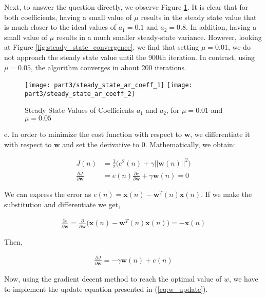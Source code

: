 \noindent{}Next, to answer the question directly, we observe Figure \ref{fig:steady_state_AR}. It is clear that for both coefficients, having a small value of $\mu$ results in the steady state value that is much closer to the ideal values of $a_1=0.1$ and $a_2=0.8$. In addition, having a small value of $\mu$ results in a much smaller steady-state variance. However, looking at Figure \ref{fig:steady_state_convergence}, we find that setting $\mu=0.01$, we do not approach the steady state value until the 900th iteration. In contrast, using $\mu=0.05$, the algorithm converges in about 200 iterations.

\begin{figure}[H]
\centering{}
\texttt{[image: part3/steady\_state\_ar\_coeff\_1]}
\texttt{[image: part3/steady\_state\_ar\_coeff\_2]}
\caption{Steady State Values of Coefficients $a_1$ and $a_2$, for $\mu=0.01$ and $\mu=0.05$}
\label{fig:steady_state_AR}
\end{figure}

\noindent{}e. In order to minimize the cost function with respect to $\textbf{w}$, we differentiate it with respect to $\textbf{w}$ and set the derivative to 0. Mathematically, we obtain:

\begin{align}
J(n) &= \frac{1}{2}\Bigg(e^2(n)+\gamma||\textbf{w}(n)||^2\Bigg) \label{eq:cost_func}\\ 
\frac{\partial J}{\partial \textbf{w}} &= e(n)\frac{\partial e}{\partial \textbf{w}} + \gamma \textbf{w}(n) = 0 \nonumber
\end{align}

\noindent{}We can express the error as $e(n)=\textbf{x}(n) - \textbf{w}^T(n)\textbf{x}(n)$. If we make the substitution and differentiate we get,

\begin{align*}
\frac{\partial e}{\partial \textbf{w}} = \frac{\partial}{\partial \textbf{w}}\Bigg(\textbf{x}(n) - \textbf{w}^T(n)\textbf{x}(n)\Bigg) = -\textbf{x}(n)
\end{align*}

\noindent{}Then,

\begin{align*}
\frac{\partial J}{\partial \textbf{w}} = -\gamma \textbf{w}(n) + e(n)
\end{align*}

\noindent{}Now, using the gradient decent method to reach the optimal value of $w$, we have to implement the update equation presented in (\ref{eq:w_update}).

